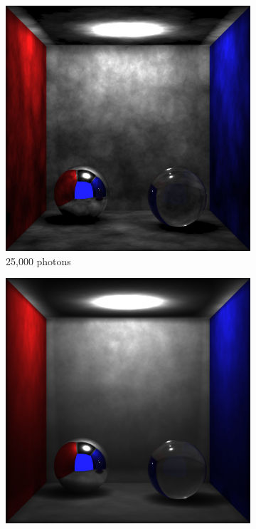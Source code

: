 \begin{figure}[h]
	\centering
	\begin{subfigure}[c]{0.3\textwidth}
	\includegraphics[width=\textwidth]{./images/renders/direct_photon_comp/photon_50000.png}
	\caption{25,000 photons}
	\end{subfigure}
	\begin{subfigure}[c]{0.3\textwidth}
	\includegraphics[width=\textwidth]{./images/renders/direct_photon_comp/photon.png}

\end{subfigure}
\end{figure}
